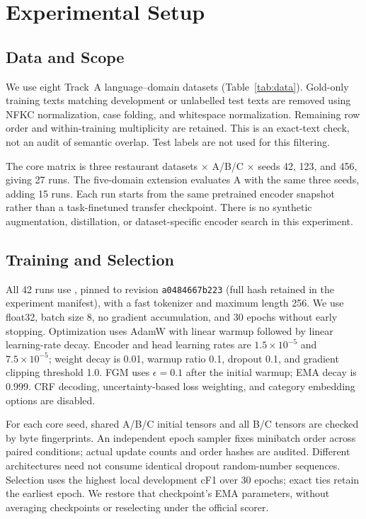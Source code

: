 \documentclass[conference]{IEEEtran}
\begin{document}
\section{Experimental Setup}
\subsection{Data and Scope}

We use eight Track~A language--domain datasets (Table~\ref{tab:data}). Gold-only training texts matching development or unlabelled test texts are removed using NFKC normalization, case folding, and whitespace normalization. Remaining row order and within-training multiplicity are retained. This is an exact-text check, not an audit of semantic overlap. Test labels are not used for this filtering.

The core matrix is three restaurant datasets $\times$ A/B/C $\times$ seeds 42, 123, and 456, giving 27 runs. The five-domain extension evaluates A with the same three seeds, adding 15 runs. Each run starts from the same pretrained encoder snapshot rather than a task-finetuned transfer checkpoint. There is no synthetic augmentation, distillation, or dataset-specific encoder search in this experiment.

\subsection{Training and Selection}
All 42 runs use , pinned to revision \texttt{a0484667b223} (full hash retained in the experiment manifest), with a fast tokenizer and maximum length 256. We use float32, batch size 8, no gradient accumulation, and 30 epochs without early stopping. Optimization uses AdamW with linear warmup followed by linear learning-rate decay. Encoder and head learning rates are $1.5\times10^{-5}$ and $7.5\times10^{-5}$; weight decay is 0.01, warmup ratio 0.1, dropout 0.1, and gradient clipping threshold 1.0. FGM uses $\epsilon=0.1$ after the initial warmup; EMA decay is 0.999. CRF decoding, uncertainty-based loss weighting, and category embedding options are disabled.

For each core seed, shared A/B/C initial tensors and all B/C tensors are checked by byte fingerprints. An independent epoch sampler fixes minibatch order across paired conditions; actual update counts and order hashes are audited. Different architectures need not consume identical dropout random-number sequences. Selection uses the highest local development cF1 over 30 epochs; exact ties retain the earliest epoch. We restore that checkpoint's EMA parameters, without averaging checkpoints or reselecting under the official scorer.
\end{document}
